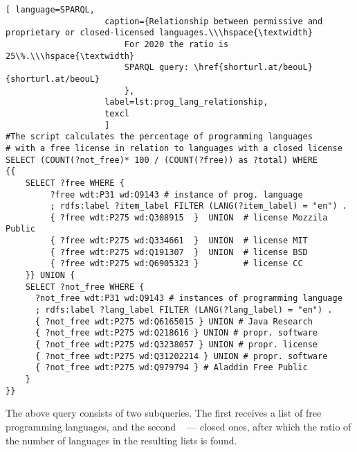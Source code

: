 \begin{lstlisting}[ language=SPARQL, 
                    caption={Relationship between permissive and proprietary or closed-licensed languages.\\\hspace{\textwidth}
                        For 2020 the ratio is 25\%.\\\hspace{\textwidth}
                        SPARQL query: \href{shorturl.at/beouL}{shorturl.at/beouL}
                        },
                    label=lst:prog_lang_relationship,
                    texcl 
                    ]
#The script calculates the percentage of programming languages 
# with a free license in relation to languages with a closed license
SELECT (COUNT(?not_free)* 100 / (COUNT(?free)) as ?total) WHERE
{{
    SELECT ?free WHERE {
         ?free wdt:P31 wd:Q9143 # instance of prog. language
         ; rdfs:label ?item_label FILTER (LANG(?item_label) = "en") . 
         { ?free wdt:P275 wd:Q308915  }  UNION  # license Mozzila Public
         { ?free wdt:P275 wd:Q334661  }  UNION  # license MIT
         { ?free wdt:P275 wd:Q191307  }  UNION  # license BSD
         { ?free wdt:P275 wd:Q6905323 }         # license CC
    }} UNION {
    SELECT ?not_free WHERE {
      ?not_free wdt:P31 wd:Q9143 # instances of programming language
      ; rdfs:label ?lang_label FILTER (LANG(?lang_label) = "en") .
      { ?not_free wdt:P275 wd:Q6165015 } UNION # Java Research
      { ?not_free wdt:P275 wd:Q218616 } UNION # propr. software
      { ?not_free wdt:P275 wd:Q3238057 } UNION # propr. license 
      { ?not_free wdt:P275 wd:Q31202214 } UNION # propr. software 
      { ?not_free wdt:P275 wd:Q979794 } # Aladdin Free Public
    }
}}
\end{lstlisting}%
The above query consists of two subqueries. The first receives a list of free programming languages, and the second ~ --- closed ones, after which the ratio of the number of languages in the resulting lists is found.

